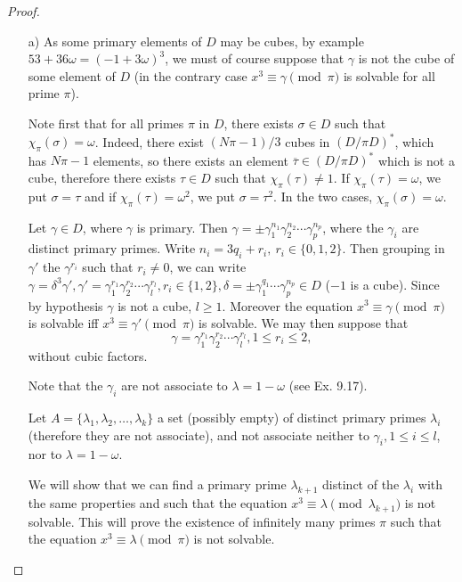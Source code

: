 \documentclass[11pt,a4paper]{article}
\begin{document}
\begin{proof}
\begin{enumerate}
\item[a)] As some primary elements of $D$ may be cubes, by example $53 + 36 \omega = (-1 + 3 \omega)^3$, we must of course suppose that $\gamma$ is not the cube of some element of $D$ (in the contrary case $x^3 \equiv \gamma \pmod \pi $ is solvable for all prime $\pi$).

Note first that for all primes $\pi$ in $D$, there exists $\sigma \in D$ such that $\chi_\pi(\sigma) = \omega$. Indeed, there exist $(N\pi - 1)/3$ cubes in $(D/\pi D)^*$, which has $N\pi - 1$ elements, so there exists an element $\overline{\tau} \in (D/\pi D)^*$ which is not a cube, therefore there exists $\tau \in D$ such that $\chi_\pi(\tau) \neq 1$. If $\chi_\pi(\tau) = \omega$, we put $\sigma = \tau$ and if $\chi_\pi(\tau) = \omega^2$, we put $\sigma = \tau^2$. In the two cases, $\chi_\pi(\sigma) = \omega$.

\bigskip

Let $\gamma \in D$, where $\gamma$ is primary. Then $\gamma = \pm \gamma_1^{n_1}\gamma_2^{n_2}\cdots\gamma_p^{n_p}$, where the $\gamma_i$ are distinct primary primes. 
Write $n_i = 3q_i + r_i, \ r_i \in \{0,1,2\}$. Then grouping in $\gamma'$ the $\gamma^{r_i}$ such that $r_i \ne 0$, we can write $\gamma = \delta^3 \gamma', \gamma' = \gamma_1^{r_1} \gamma_2^{r_2}\cdots \gamma_l^{r_l}, r_i \in \{1,2\}, \delta = \pm \gamma_1^{q_1}\cdots\gamma_p^{n_p} \in D$ ($-1$ is a cube). Since by hypothesis $\gamma$ is not a cube, $l\geq 1$. Moreover the equation $x^3 \equiv \gamma \pmod \pi$ is solvable iff $x^3 \equiv \gamma' \pmod \pi$ is solvable. We may then suppose that $$\gamma = \gamma_1^{r_1} \gamma_2^{r_2}\cdots \gamma_l^{r_l}, 1\leq r_i \leq 2,$$ without cubic factors.

Note that the $\gamma_i$ are not associate to $\lambda = 1-\omega$ (see Ex. 9.17).

Let $A = \{\lambda_1,\lambda_2,\ldots, \lambda_k\}$  a set (possibly empty) of distinct primary primes $\lambda_i$ (therefore  they are not associate), and not associate neither to $\gamma_i, 1 \leq i \leq l$, nor to $\lambda = 1 - \omega$.

We will show that we can find a primary prime $\lambda_{k+1}$ distinct of the $\lambda_i$ with the same properties and such that the equation $x^3 \equiv \lambda \pmod {\lambda_{k+1}}$ is not solvable. This will prove the existence of infinitely many primes $\pi$ such that the equation $x^3 \equiv \lambda \pmod \pi$ is not solvable.


\end{enumerate}
\end{proof}
\end{document}
